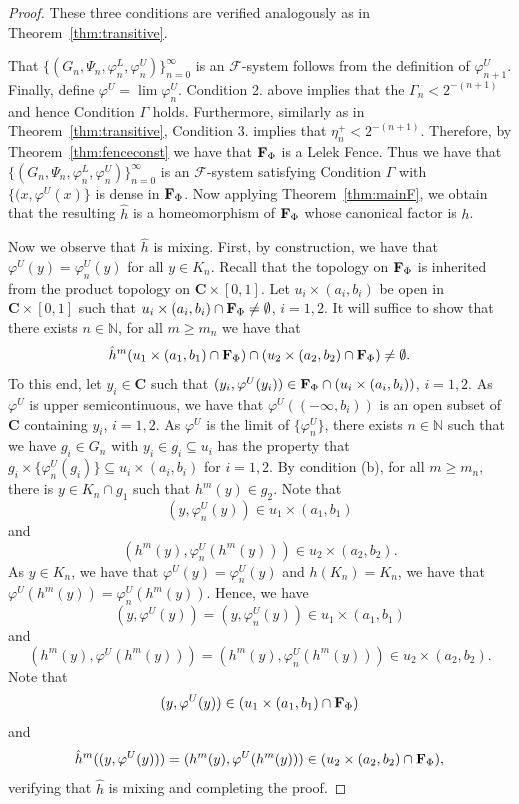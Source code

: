 \documentclass[10pt,a4paper]{amsart}
\newcommand{\N}{\mathbb{N}}  %
\newcommand{\cF}{\mathcal{F}}
\newcommand{\cantor}{\mathbf C}
\newcommand{\fence}{{\bf F}_{\Phi}{}}
\newcommand{\fsystem}{\{(G_n, \Psi_n,\varphi^L_n,\varphi^U_n)\}_{n=0}^{\infty}}
\begin{document}
\begin{proof}
These three conditions are verified analogously as in Theorem~\ref{thm:transitive}.    

That $\fsystem$ is an $\cF$-system follows from the definition of $\varphi^U_{n+1}$. 
Finally, define $\varphi^U = \lim \varphi^U_n$. Condition 2. above implies that the $\Gamma_n < 2^{-(n+1)}$ and hence  Condition $\Gamma$ holds. Furthermore, similarly as in Theorem~\ref{thm:transitive}, Condition 3. implies that $\eta^+_n < 2^{-(n+1)}$. Therefore, by Theorem~\ref{thm:fenceconst} we have that $\fence$ is a Lelek Fence. Thus we have that  $\fsystem$ is an $\cF$-system satisfying Condition $\Gamma$ with $\{(x, \varphi^U(x)\}$ is dense in $\fence$.
Now applying Theorem~\ref{thm:mainF}, we obtain that the resulting $\hat{h}$ is a homeomorphism of $\fence$ whose canonical factor is $h$. 

Now we observe that $\hat h$ is mixing. First, by construction, we have that $\varphi ^U(y) = \varphi^U_n (y)$ for all $y \in K_n$. Recall that the topology on $\fence$ is inherited from the product topology on $\cantor \times [0,1]$. Let $u_i \times (a_i,b_i)$ be open in  $\cantor \times [0,1]$ such that $ u_i \times (a_i,b_i) \cap \fence  \neq \emptyset$, $i=1,2$. It will suffice to show that there exists $n \in \N$, for  all  $m \ge m_n$ we have that 
\[
\hat{h}^{m} (u_1 \times (a_1,b_1) \cap \fence) \cap (u_2 \times (a_2,b_2) \cap \fence)  \neq \emptyset.
\]
To this end, let  $y_i \in \cantor$ such that $(y_i, \varphi^U(y_i)) \in \fence\cap (u_i \times (a_i,b_i))$, $i=1,2$. As $\varphi^U$ is upper semicontinuous, we have that $\varphi^U ((-\infty, b_i))$ is an open subset of $\cantor$ containing $y_i$, $i=1,2$. As $\varphi^U$ is the limit of $\{\varphi^U_n\}$, there exists $n\in \N$ such that  we have $g_i \in G_n$ with $y_i \in g_i \subseteq u_i$ has the property that $g_i \times \{\varphi^U_n(g_i)\} \subseteq u_i \times (a_i,b_i)$ for $i=1,2$. By condition (b), for all  $m \ge m_n$, there is $y\in K_n \cap g_1$ such that  $h^m(y) \in g_2$. Note that 
\[(y, \varphi^U_n(y)) \in u_1 \times (a_1,b_1) 
\]
and 
\[(h^m(y), \varphi^U_n(h^m(y))) \in u_2 \times (a_2,b_2).
\]
As $y \in K_n$, we have that $\varphi^U(y) =\varphi^U_n(y)$ and $h(K_n) =K_n$, we have that $\varphi^U(h^m(y)) =\varphi^U_n(h^m(y))$. Hence, we have 
\[ (y, \varphi^U(y)) = (y, \varphi^U_n(y)) \in u_1 \times (a_1,b_1) \]
and \[ (h^m(y), \varphi^U(h^m(y))) = (h^m(y), \varphi^U_n(h^m(y))) \in u_2 \times (a_2,b_2). \]  Note that \[(y, \varphi^U(y)) \in (u_1 \times (a_1,b_1) \cap \fence) 
\]
and  
\[\hat{h}^m ((y, \varphi^U(y))) = (h^m(y), \varphi^U(h^m(y)))  \in (u_2 \times (a_2,b_2) \cap \fence),
\]
verifying that $\hat{h}$ is mixing and completing the proof.
\end{proof}
\end{document}
